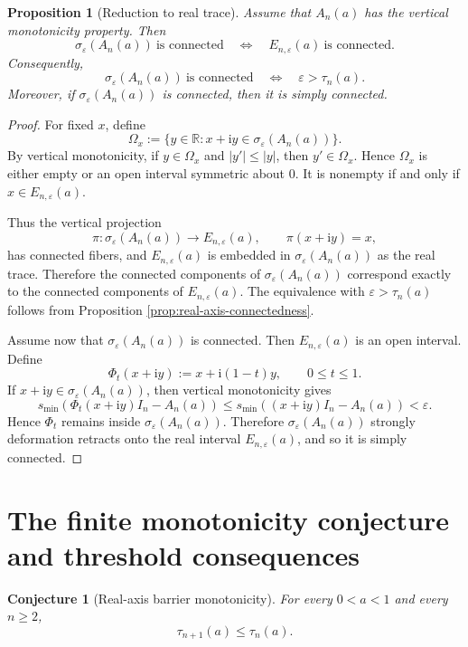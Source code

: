 \documentclass[11pt]{amsart}
\numberwithin{equation}{section}
\newcommand{\R}{\mathbb R}
\newcommand{\eps}{\varepsilon}
\newcommand{\ii}{\mathrm i}
\newtheorem{proposition}[theorem]{Proposition}
\newtheorem{conjecture}[theorem]{Conjecture}
\begin{document}
\begin{proposition}[Reduction to real trace]\label{prop:planar-reduction}
Assume that \(A_n(a)\) has the vertical monotonicity property.  Then
\[
\sigma_\eps(A_n(a))\ \text{is connected}
\quad\Longleftrightarrow\quad
E_{n,\eps}(a)\ \text{is connected}.
\]
Consequently,
\[
\sigma_\eps(A_n(a))\ \text{is connected}
\quad\Longleftrightarrow\quad
\eps>\tau_n(a).
\]
Moreover, if \(\sigma_\eps(A_n(a))\) is connected, then it is simply connected.
\end{proposition}

\begin{proof}
For fixed \(x\), define
\[
\Omega_x
:=
\{y\in\R:x+\ii y\in\sigma_\eps(A_n(a))\}.
\]
By vertical monotonicity, if \(y\in\Omega_x\) and \(|y'|\le |y|\), then \(y'\in\Omega_x\).  Hence \(\Omega_x\) is either empty or an open interval symmetric about \(0\).  It is nonempty if and only if \(x\in E_{n,\eps}(a)\).

Thus the vertical projection
\[
\pi:\sigma_\eps(A_n(a))\to E_{n,\eps}(a),
\qquad
\pi(x+\ii y)=x,
\]
has connected fibers, and \(E_{n,\eps}(a)\) is embedded in \(\sigma_\eps(A_n(a))\) as the real trace.  Therefore the connected components of \(\sigma_\eps(A_n(a))\) correspond exactly to the connected components of \(E_{n,\eps}(a)\).  The equivalence with \(\eps>\tau_n(a)\) follows from Proposition \ref{prop:real-axis-connectedness}.

Assume now that \(\sigma_\eps(A_n(a))\) is connected.  Then \(E_{n,\eps}(a)\) is an open interval.  Define
\[
\Phi_t(x+\ii y):=x+\ii(1-t)y,
\qquad 0\le t\le1.
\]
If \(x+\ii y\in\sigma_\eps(A_n(a))\), then vertical monotonicity gives
\[
s_{\min}(\Phi_t(x+\ii y)I_n-A_n(a))
\le
s_{\min}((x+\ii y)I_n-A_n(a))
<
\eps.
\]
Hence \(\Phi_t\) remains inside \(\sigma_\eps(A_n(a))\).  Therefore \(\sigma_\eps(A_n(a))\) strongly deformation retracts onto the real interval \(E_{n,\eps}(a)\), and so it is simply connected.
\end{proof}

\section{The finite monotonicity conjecture and threshold consequences}

\begin{conjecture}[Real-axis barrier monotonicity]\label{conj:barrier}
For every \(0<a<1\) and every \(n\ge2\),
\[
\tau_{n+1}(a)\le\tau_n(a).
\]
\end{conjecture}
\end{document}
